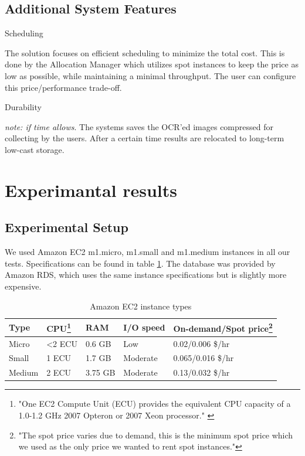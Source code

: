\documentclass[a4paper]{IEEEtran}
\begin{document}
\subsection*{Additional System Features}

\begin{LaTeXdescription}

\item[Scheduling]

The solution focuses on efficient scheduling to minimize the total cost. This is done by the Allocation Manager which utilizes spot instances to keep the price as low as possible, while maintaining a minimal throughput. The user can configure this price/performance trade-off.

\item[Durability]

\emph{note: if time allows}. The systems saves the OCR'ed images compressed for collecting by the users. After a certain time results are relocated to long-term low-cast storage.

\end{LaTeXdescription}

\section{Experimantal results}

\subsection{Experimental Setup}

We used Amazon EC2 m1.micro, m1.small and m1.medium instances in all our tests. Specifications can be found in table \ref{amazoninstancespec}. The database was provided by Amazon RDS, which uses the same instance specifications but is slightly more expensive.

\begin{savenotes}
\begin{table}
\centering

\begin{tabular}{| l | l | l | l | l |}
\hline
Type & CPU\footnote{"One EC2 Compute Unit (ECU) provides the equivalent CPU capacity of a 1.0-1.2 GHz 2007 Opteron or 2007 Xeon processor." \cite{amazonecu}} & RAM & I/O speed & On-demand/Spot price\footnote{"The spot price varies due to demand, this is the minimum spot price which we used as the only price we wanted to rent spot instances."} \\ \hline
Micro & \textless 2 ECU & 0.6 GB & Low & 0.02/0.006 \$/hr \\ \hline
Small & 1 ECU & 1.7 GB & Moderate & 0.065/0.016 \$/hr \\ \hline
Medium & 2 ECU & 3.75 GB & Moderate & 0.13/0.032 \$/hr \\ \hline
\end{tabular}

\caption{Amazon EC2 instance types}
\label{amazoninstancespec}
\end{table}
\end{savenotes}
\end{document}
